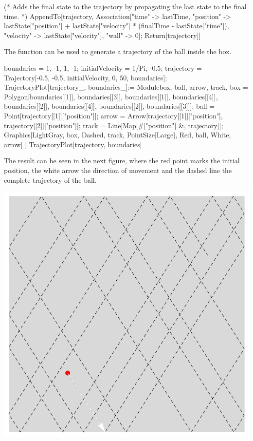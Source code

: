 \documentclass{tstextbook}
\begin{document}
\begin{example}
\begin{mathematica}
   (* Adds the final state to the trajectory by propagating the last state
      to the final time. *)
   AppendTo[trajectory,
            Association["time" -> lastTime,
                        "position" -> lastState["position"] +
                        lastState["velocity"] *
                        (finalTime - lastState["time"]), 
                        "velocity" -> lastState["velocity"],
                        "wall" -> 0]; 
   Return[trajectory]]
\end{mathematica}
The function can be used to generate a trajectory of the ball inside the box.
\begin{mathematica}
boundaries = {1, -1, 1, -1};
initialVelocity = {1/Pi, -0.5};
trajectory = Trajectory[{-0.5, -0.5}, initialVelocity, 0, 50, boundaries];
TrajectoryPlot[trajectory_, boundaries_]:= Module{box, ball, arrow, track},
    box = Polygon[{{boundaries[[1]], boundaries[[3]]},
                   {boundaries[[1]], boundaries[[4]]},
                   {boundaries[[2]], boundaries[[4]]},
                   {boundaries[[2]], boundaries[[3]]}}];
    ball = Point[trajectory[[1]]["position"]];
    arrow = Arrow[{trajectory[[1]]["position"], trajectory[[2]]["position"]}];
    track = Line[Map[#["position"] &, trajectory]];
    Graphics[{{LightGray, box},
              {Dashed, track},
              {PointSize[Large], Red, ball},
              {White, arrow}}]
]
TrajectoryPlot[trajectory, boundaries]
\end{mathematica}
The result can be seen in the next figure, where the red point marks the initial position, the white arrow the direction of movement and the dashed line the complete trajectory of the ball. 

\includegraphics[scale=0.5, center]{images/ball_trajectory.pdf}


\end{example}
\end{document}

